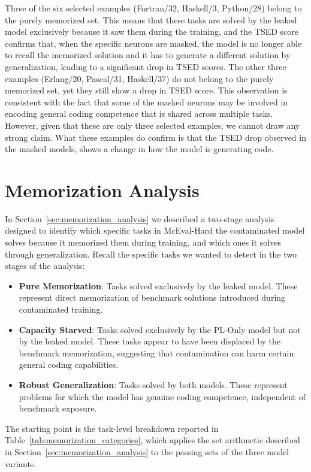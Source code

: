\documentclass[mscthesis]{usiinfthesis}
\begin{document}
Three of the six selected examples (Fortran/32, Haskell/3, Python/28) belong to the purely memorized set.
This means that these tasks are solved by the leaked model exclusively because it saw them during the training, and the TSED score
confirms that, when the specific neurons are masked, the model is no longer able to recall the memorized solution and it has to
generate a different solution by generalization, leading to a significant drop in TSED scores.
The other three examples (Erlang/20, Pascal/31, Haskell/37) do not belong to the purely memorized set, yet they still show a drop in TSED score.
This observation is consistent with the fact that some of the masked neurons may be involved
in encoding general coding competence that is shared across multiple tasks.
However, given that these are only three selected examples, we cannot draw any strong claim.
What these examples do confirm is that the TSED drop observed in the masked models, 
shows a change in how the model is generating code.


\section{Memorization Analysis}
\label{sec:memorization_analysis_results}
In Section~\ref{sec:memorization_analysis} we described a two-stage analysis designed to identify which specific tasks in McEval-Hard the contaminated model solves because it memorized them during training, and which ones it solves through generalization.
Recall the specific tasks we wanted to detect in the two stages of the analysis:
\begin{itemize}
	\item \textbf{Pure Memorization}: Tasks solved exclusively by the leaked model. These represent direct memorization of benchmark solutions introduced during contaminated training.
	\item \textbf{Capacity Starved}: Tasks solved exclusively by the PL-Only model but not by the leaked model. These tasks appear to have been displaced by the benchmark memorization, suggesting that contamination can harm certain general coding capabilities.
	\item \textbf{Robust Generalization}: Tasks solved by both models. These represent problems for which the model has genuine coding competence, independent of benchmark exposure.
\end{itemize}
The starting point is the task-level breakdown reported in Table~\ref{tab:memorization_categories}, which applies the set arithmetic described in
Section~\ref{sec:memorization_analysis} to the passing sets of the three model variants.
\end{document}
